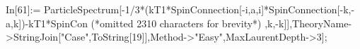 In[61]:= ParticleSpectrum[-1/3*(kT1*SpinConnection[-i,a,i]*SpinConnection[-k,-a,k])-kT1*SpinCon (*omitted 2310 characters for brevity*) ,k,-k]],TheoryName->StringJoin["Case",ToString[19]],Method->"Easy",MaxLaurentDepth->3];
